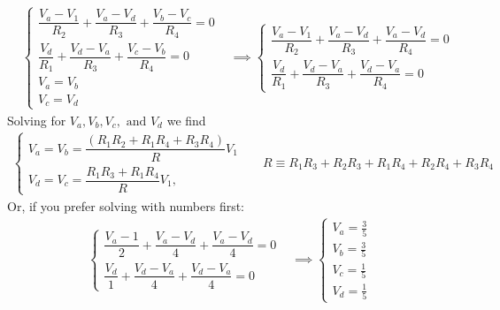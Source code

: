 \begin{enumerate}
{    \begin{align*}
    &\begin{cases*}
        \dfrac{V_a - V_1}{R_2} + \dfrac{V_a - V_d}{R_3} + \dfrac{V_b - V_c}{R_4} = 0 \\
    \dfrac{V_d}{R_1} + \dfrac{V_d - V_a}{R_3} + \dfrac{V_c - V_b}{R_4} = 0 \\
    V_a = V_b \\
    V_c = V_d 
    \end{cases*}
    &\implies
    \begin{cases*}
    \dfrac{V_a - V_1}{R_2} + \dfrac{V_a - V_d}{R_3} + \dfrac{V_a - V_d}{R_4} = 0 \\
    \dfrac{V_d}{R_1} + \dfrac{V_d - V_a}{R_3} + \dfrac{V_d - V_a}{R_4} = 0
    \end{cases*} 
    \end{align*}
    Solving for $V_a, V_b, V_c, \text{ and } V_d$ we find
    \begin{align*}
    \begin{cases*}
    V_a = V_b = \dfrac{(R_1 R_2 + R_1 R_4 + R_3 R_4)}{R} V_1\\
    V_d = V_c = \dfrac{R_1R_3 + R_1R_4}{R} V_1,
    \end{cases*}&&
    R \equiv R_1R_3+R_2R_3+R_1R_4+R_2R_4+R_3R_4
    \end{align*}
    Or, if you prefer solving with numbers first:
    \begin{align*}
        \begin{cases*}
        \dfrac{V_a - 1}{2} + \dfrac{V_a - V_d}{4} + \dfrac{V_a - V_d}{4} = 0 \\
        \dfrac{V_d}{1} + \dfrac{V_d - V_a}{4} + \dfrac{V_d - V_a}{4} = 0
        \end{cases*}
        &\implies
        \boxed{
        \begin{cases*}
        V_a = \frac{3}{5}\\
        V_b = \frac{3}{5}\\
        V_c = \frac{1}{5}\\
        V_d = \frac{1}{5}
        \end{cases*}}
    \end{align*}
}


\sol{
    \begin{center}
    \begin{circuitikz}[line width=0.5pt]
    

\end{circuitikz}
\end{center}}
\end{enumerate}
